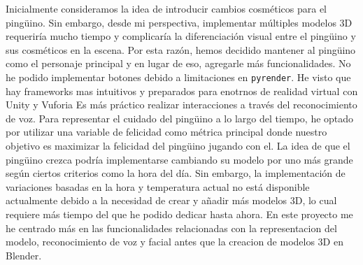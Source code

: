 \documentclass{article}
\begin{document}
Inicialmente consideramos la idea de introducir cambios 
cosméticos para el pingüino. Sin embargo, desde mi perspectiva, 
implementar múltiples modelos 3D requeriría mucho tiempo y 
complicaría la diferenciación visual entre el pingüino y sus
cosméticos en la escena. Por esta razón, hemos decidido 
mantener al pingüino como el personaje principal y en lugar de eso,
agregarle más funcionalidades.
\vskip 0.1in
No he podido implementar botones debido a limitaciones en 
\texttt{pyrender}. He visto que hay frameworks mas intuitivos y preparados 
para enotrnos de realidad virtual con Unity y Vuforia
 Es más práctico realizar interacciones a 
través del reconocimiento de voz. Para representar el cuidado 
del pingüino a lo largo del tiempo, he optado por utilizar una 
variable de felicidad como métrica principal donde nuestro objetivo es 
maximizar la felicidad del pingüino jugando con el.
\vskip 0.1in
La idea de que el pingüino crezca podría implementarse 
cambiando su modelo por uno más grande según ciertos criterios
 como la hora del día. Sin embargo, la implementación de 
 variaciones basadas en la hora y temperatura actual no 
 está disponible actualmente debido a la necesidad de crear 
 y añadir más modelos 3D, lo cual requiere más tiempo del que
  he podido dedicar hasta ahora. En este proyecto me he centrado más en las funcionalidades relacionadas con la representacion del modelo,
  reconocimiento de voz y facial antes que la creacion de modelos 3D en Blender.
\end{document}
